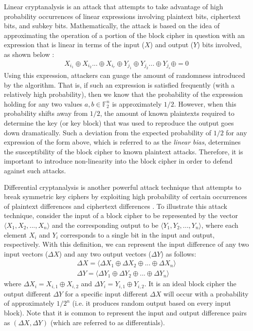 \documentclass[11pt]{article}
\newcommand{\field}[1]{\mathbb{#1}} %
\begin{document}
Linear cryptanalysis is an attack that attempts to take advantage of high probability occurrences of linear expressions involving plaintext bits, ciphertext bits, and subkey bits. Mathematically, the attack is based on the idea of approximating the operation of a portion of the block cipher in question with an expression that is linear in terms of the input ($X$) and output ($Y$) bits involved, as shown below \cite{Heys01atutorial}:
\begin{eqnarray*}
X_{i_{1}} \oplus X_{i_{2}} ... \oplus X_{i_{r}} \oplus Y_{j_{1}} \oplus Y_{j_{2}} ... \oplus Y_{j_{s}} \oplus  = 0
\end{eqnarray*}
Using this expression, attackers can guage the amount of randomness introduced by the algorithm. That is, if such an expression is satisfied frequently (with a relatively high probability), then we know that the probability of the expression holding for any two values $a,b\in \field{F}_2^n$ is approximately $1/2$. However, when this probability shifts away from $1/2$, the amount of known plaintexts required to determine the key (or key block) that was used to reproduce the output goes down dramatically. Such a deviation from the expected probability of $1/2$ for any expression of the form above, which is referred to as the \emph{linear bias}, determines the susceptibility of the block cipher to known plaintext attacks. Therefore, it is important to introduce non-linearity into the block cipher in order to defend against such attacks.

Differential cryptanalysis is another powerful attack technique that attempts to break symmetric key ciphers by exploiting high probability of certain occurrences of plaintext differences and ciphertext differences \cite{Heys01atutorial}. To illustrate this attack technique, consider the input of a block cipher to be represented by the vector $\langle X_1, X_2,..., X_n \rangle$ and the corresponding output to be $\langle Y_1, Y_2, ..., Y_n \rangle$, where each element $X_i$ and $Y_i$ corresponds to a single bit in the input and output, respectively. With this definition, we can represent the input difference of any two input vectors ($\Delta X$) and any two output vectors ($\Delta Y$) as follows:
\begin{eqnarray*}
\Delta X = \langle \Delta X_1 \oplus \Delta X_2 \oplus ... \oplus \Delta X_n \rangle  \\
\Delta Y= \langle \Delta Y_1 \oplus \Delta Y_2 \oplus ... \oplus \Delta Y_n \rangle
\end{eqnarray*}
where $\Delta X_i = X_{i,1} \oplus X_{i,2}$ and $\Delta Y_i = Y_{i,1} \oplus Y_{i,2}$. It is an ideal block cipher the output different $\Delta Y$ for a specific input different $\Delta X$ will occur with a probability of approximately $1/2^n$ (i.e. it produces random output based on every input block). Note that it is common to represent the input and output difference pairs as $(\Delta X, \Delta Y)$ (which are referred to as differentials).
\end{document}
